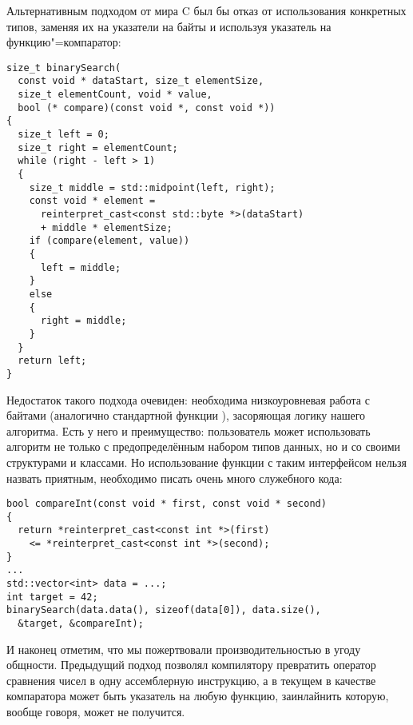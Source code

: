 Альтернативным подходом от мира C был бы отказ от использования конкретных типов, заменяя их на указатели на байты и используя указатель на функцию"=компаратор:
\begin{verbatim}
size_t binarySearch(
  const void * dataStart, size_t elementSize,
  size_t elementCount, void * value,
  bool (* compare)(const void *, const void *))
{
  size_t left = 0;
  size_t right = elementCount;
  while (right - left > 1)
  {
    size_t middle = std::midpoint(left, right);
    const void * element =
      reinterpret_cast<const std::byte *>(dataStart)
      + middle * elementSize;
    if (compare(element, value))
    {
      left = middle;
    }
    else
    {
      right = middle;
    }
  }
  return left;
}
\end{verbatim}
Недостаток такого подхода очевиден: необходима низкоуровневая работа с байтами (аналогично стандартной функции ), засоряющая логику нашего алгоритма.
Есть у него и преимущество: пользователь может использовать алгоритм не только с предопределённым набором типов данных, но и со своими структурами и классами.
Но использование функции с таким интерфейсом нельзя назвать приятным, необходимо писать очень много служебного кода:
\begin{verbatim}
bool compareInt(const void * first, const void * second)
{
  return *reinterpret_cast<const int *>(first)
    <= *reinterpret_cast<const int *>(second);
}
...
std::vector<int> data = ...;
int target = 42;
binarySearch(data.data(), sizeof(data[0]), data.size(),
  &target, &compareInt);
\end{verbatim}
И наконец отметим, что мы пожертвовали производительностью в угоду общности.
Предыдущий подход позволял компилятору превратить оператор сравнения чисел в одну ассемблерную инструкцию, а в текущем в качестве компаратора может быть указатель на любую функцию, заинлайнить которую, вообще говоря, может не получится.

